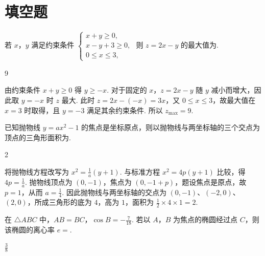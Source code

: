 \section{填空题}

\begin{problem}
若 \(x\)，\(y\) 满足约束条件 \(\begin{cases}
x + y \geqslant 0,\\
x - y + 3 \geqslant 0,\\
0 \leqslant x \leqslant 3,
\end{cases}\) 则 \(z = 2x - y\) 的最大值为\fillinblank{}.
\end{problem}

\begin{answer}
9
\end{answer}

\begin{solution}
由约束条件 \(x+y\geqslant 0\) 得 \(y\geqslant -x\). 对于固定的 \(x\)，\(z=2x-y\) 随 \(y\) 减小而增大，因此取 \(y=-x\) 时 \(z\) 最大. 此时 \(z=2x-(-x)=3x\)，又 \(0\leqslant x\leqslant 3\)，故最大值在 \(x=3\) 时取得，且 \(y=-3\) 满足其余约束条件. 所以 \(z_{\max}=9\).
\end{solution}

\begin{problem}
已知抛物线 \( y = ax^2 - 1 \) 的焦点是坐标原点，则以抛物线与两坐标轴的三个交点为顶点的三角形面积为\fillinblank{}.
\end{problem}

\begin{answer}
2
\end{answer}

\begin{solution}
将抛物线方程改写为 \(x^2=\frac{1}{a}(y+1)\). 与标准方程 \(x^2=4p(y+1)\) 比较，得 \(4p=\frac{1}{a}\). 抛物线顶点为 \((0,-1)\)，焦点为 \((0,-1+p)\)，题设焦点是原点，故 \(p=1\)，从而 \(a=\frac{1}{4}\). 因此抛物线与两坐标轴的交点为 \((0,-1)\)、\((-2,0)\)、\((2,0)\)，所成三角形的底为 \(4\)，高为 \(1\)，面积为 \(\frac{1}{2}\times4\times1=2\).
\end{solution}

\begin{problem}
在 \(\triangle ABC\) 中，\(AB = BC\)，\(\cos B = -\frac{7}{18}\). 若以 \(A\)，\(B\) 为焦点的椭圆经过点 \(C\)，则该椭圆的离心率 \(e = \)\fillinblank{}.
\end{problem}

\begin{answer}
\(\frac{3}{8}\)
\end{answer}

